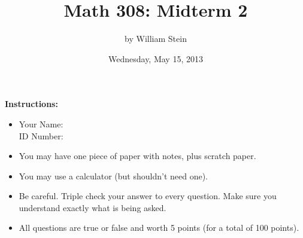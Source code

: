 \documentclass[10pt]{article}
\title{\color{blue}\bf Math 308: Midterm 2}
\date{Wednesday, May 15, 2013}
\author{by William Stein}
\begin{document}
\maketitle
{\noindent\bf\color{red} Instructions:}
\begin{itemize}
\item {\color{blue} Your Name: \underline{\hspace{20em}}\\ID Number: \underline{\hspace{10em}}}
\item You may have one piece of paper with notes, plus scratch paper.
\item You may use a calculator (but shouldn't need one).
\item Be careful.  Triple check your answer to every question.  Make sure you understand exactly what is being asked.
\item All questions are true or false and worth 5 points (for a total of 100 points).
\end{itemize}
\end{document}
